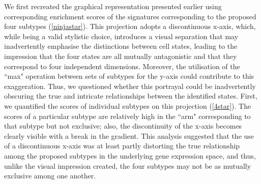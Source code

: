 \documentclass[11pt,a4paper]{article}
\begin{document}
We first recreated the graphical representation presented earlier \parencite{Neftel} using corresponding enrichment scores of the signatures corresponding to the proposed four subtypes (\autoref{ninjastar}). This projection adopts a discontinuous x-axis, which, while being a valid stylistic choice, introduces a visual separation that may inadvertently emphasise the distinctions between cell states, leading to the impression that the four states are all mutually antagonistic and that they correspond to four independent dimensions. Moreover, the utilisation of the “max" operation between sets of subtypes for the y-axis could contribute to this exaggeration. Thus, we questioned whether this portrayal could be inadvertently obscuring the true and intricate relationships between the identified states. First, we quantified the scores of individual subtypes on this projection (\autoref{4star}). The scores of a particular subtype are relatively high in the “arm" corresponding to that subtype but not exclusive; also, the discontinuity of the x-axis becomes clearly visible with a break in the gradient. This analysis suggested that the use of a discontinuous x-axis was at least partly distorting the true relationship among the proposed subtypes in the underlying gene expression space, and thus, unlike the visual impression created, the four subtypes may not be as mutually exclusive among one another.
\end{document}
